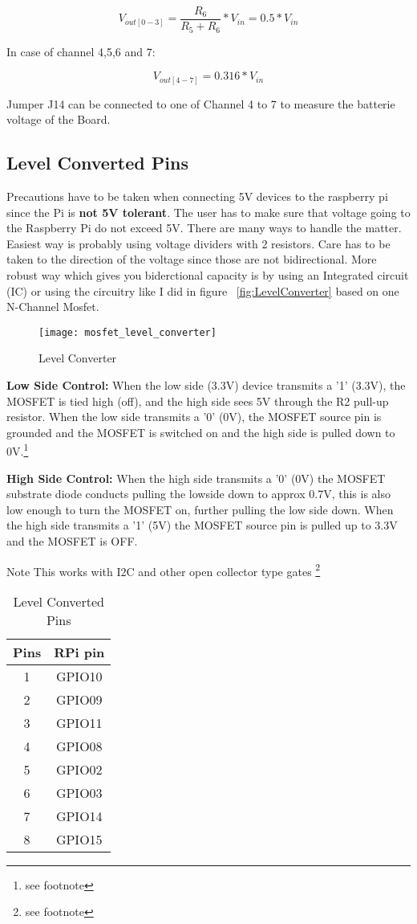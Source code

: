 \documentclass[
10pt, %
a4paper, %
oneside, %
headinclude,footinclude, %
BCOR=5mm, %
table,
]{scrartcl}
\begin{document}
\[ V_{ out[0-3] } = \frac{ R_{6} }{ R_{5} + R_{6} } * V_{in}  = 0.5* V_{in}\]

In case of channel 4,5,6 and 7:

\[ V_{out[4-7]} = 0.316 * V_{in}\]

Jumper J14 can be connected to one of Channel 4 to 7 to measure the batterie voltage of the Board.

\subsection{Level Converted Pins}
Precautions have to be taken when connecting 5V devices to the raspberry pi since the Pi is \textbf{not 5V tolerant}. The user has to make sure that voltage going to the Raspberry Pi do not exceed 5V. There are many ways to handle the matter. Easiest way is probably using voltage dividers with 2 resistors. Care has to be taken to the direction of the voltage since those are not bidirectional. More robust way which gives you biderctional capacity is by using an Integrated circuit (IC) or using the circuitry like I did in figure  ~\vref{fig:LevelConverter} based on one N-Channel Mosfet.


\begin{figure}[h]
\centering
\texttt{[image: mosfet\_level\_converter]} 
\caption[Level Converter]{Level Converter \footnotemark}
\label{fig:LevelConverter}
\end{figure}

\textbf{Low Side Control:} When the low side (3.3V) device transmits a '1' (3.3V), the MOSFET is tied high (off), and the high side sees 5V through the R2 pull-up resistor. When the low side transmits a '0' (0V), the MOSFET source pin is grounded and the MOSFET is switched on and the high side is pulled down to 0V.\footnote{see footnote }

\textbf{High Side Control:} When the high side transmits a '0' (0V) the MOSFET substrate diode conducts pulling the lowside down to approx 0.7V, this is also low enough to turn the MOSFET on, further pulling the low side down. When the high side transmits a '1' (5V) the MOSFET source pin is pulled up to 3.3V and the MOSFET is OFF.

Note This works with I2C and other open collector type gates \footnote{see footnote }


\begin{table}[H]
\centering
\begin{tabular}{|cc|}
\hline
Pins & RPi pin \\
\hline
1  & GPIO10 \\
2  & GPIO09 \\
3  & GPIO11 \\
4  & GPIO08 \\
5  & GPIO02 \\
6  & GPIO03 \\
7  & GPIO14 \\
8  & GPIO15 \\
\hline
\end{tabular}
\label{tab:label}
\caption{Level Converted Pins}
\end{table}
\end{document}
